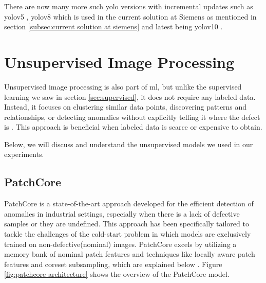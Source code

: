 There are now many more such \gls{yolo} versions with incremental updates such as \gls{yolo}v5 \cite{yolov5}, \gls{yolo}v8 \cite{Ultralytics2024} which is used in the current solution at Siemens as mentioned in section \ref{subsec:current solution at siemens} and latest being \gls{yolo}v10 \cite{Ultralytics2024v10}.

\section{Unsupervised Image Processing}
\label{sec:unsupervised image processing}

Unsupervised image processing is also part of \gls{ml}, but unlike the supervised learning we saw in section \ref{sec:supervised}, it does not require any labeled data. Instead, it focuses on clustering similar data points, discovering patterns and relationships, or detecting anomalies without explicitly telling it where the defect is \cite{geeksforgeeks-sup-unsup}. This approach is beneficial when labeled data is scarce or expensive to obtain.

Below, we will discuss and understand the unsupervised models we used in our experiments.


\subsection{PatchCore}
\label{subsec:patchcore}

PatchCore is a state-of-the-art approach developed for the efficient detection of anomalies in industrial settings, especially when there is a lack of defective samples or they are undefined. This approach has been specifically tailored to tackle the challenges of the cold-start problem in which models are exclusively trained on non-defective(nominal) images. PatchCore excels by utilizing a memory bank of nominal patch features and techniques like locally aware patch features and coreset subsampling, which are explained below \cite{roth2022totalrecallindustrialanomaly}. Figure \ref{fig:patchcore architecture} shows the overview of the PatchCore model.

